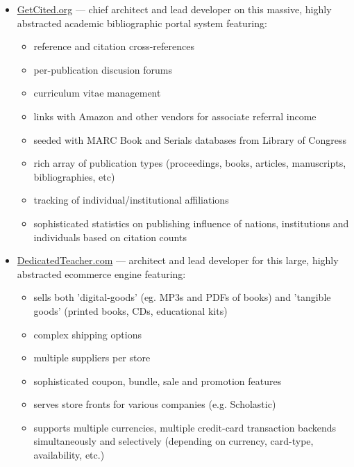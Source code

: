 \documentclass[line,margin,hidelinks]{res}
\begin{document}
\begin{resume}
\begin{position}
\begin{itemize}
\item \href{https://web.archive.org/web/20140517102110/http://getcited.org/}{GetCited.org}
  --- chief architect and lead developer on this massive, highly abstracted
      academic bibliographic portal system featuring:
  \begin{itemize}
    \item reference and citation cross-references
    \item per-publication discusion forums
    \item curriculum vitae management
    \item links with Amazon and other vendors for associate
    referral income
    \item seeded with MARC Book and Serials databases from Library of Congress
    \item rich array of publication types (proceedings, books, articles,
       manuscripts, bibliographies, etc)
    \item tracking of individual/institutional affiliations
    \item sophisticated statistics on publishing influence of
       nations, institutions and individuals based on citation counts
  \end{itemize}

\item \href{https://web.archive.org/web/20130302232056/http://www.dedicatedteacher.com/}{DedicatedTeacher.com}
   --- architect and lead developer
  for this large, highly abstracted ecommerce engine featuring:
    \begin{itemize}
      \item sells both 'digital-goods' (eg. MP3s and PDFs of books)
      and 'tangible goods' (printed books, CDs, educational kits)
      \item complex shipping options
      \item multiple suppliers per store
      \item sophisticated coupon, bundle, sale and promotion features
      \item serves store fronts for various companies
      (e.g. Scholastic)
      \item supports multiple currencies, multiple credit-card
      transaction backends simultaneously and selectively
      (depending on currency, card-type, availability, etc.)
    \end{itemize}


\end{itemize}
\end{position}
\end{resume}
\end{document}
